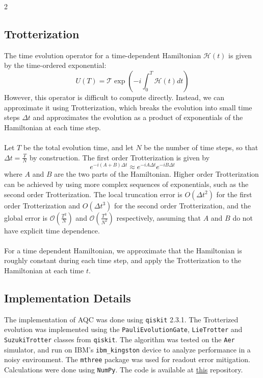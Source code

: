 \documentclass[10pt]{article}
\begin{document}
\begin{multicols*}{2}
\subsection{Trotterization}
\label{sec:trotterization}
The time evolution operator for a time-dependent Hamiltonian $\mathcal{H}(t)$ is given by the time-ordered exponential:
$$U(T) = \mathcal{T} \exp\left(-i \int_0^T \mathcal{H}(t) dt\right)$$
However, this operator is difficult to compute directly. Instead, we can approximate it using Trotterization,
which breaks the evolution into small time steps $\Delta t$ and approximates the evolution as a product of exponentials of the Hamiltonian at each time step. \\\\
Let $T$ be the total evolution time, and let $N$ be the number of time steps, so that $\Delta t = \frac{T}{N}$ by construction. The first order Trotterization is given by 
$$e^{-i (A + B) \Delta t} \approx e^{-i A \Delta t} e^{-i B \Delta t}$$
where $A$ and $B$ are the two parts of the Hamiltonian. Higher order Trotterization can be achieved by using more complex sequences of exponentials, such as the second order Trotterization.
The local truncation error is $O(\Delta t^2)$ for the first order Trotterization and $O(\Delta t^3)$ for the second order Trotterization, and the global error is $\mathcal O(\frac{T^2}{N})$ and $\mathcal O(\frac{T^3}{N^2})$ respectively, assuming that $A$ and $B$ do not have explicit time dependence.\\\\
For a time dependent Hamiltonian, we approximate that the Hamiltonian is roughly constant during each time step, and apply the Trotterization to the Hamiltonian at each time $t$.
\subsection{Implementation Details} 
The implementation of AQC was done using \texttt{qiskit}\cite{javadi-abhariQuantumComputingQiskit2024} 2.3.1. The Trotterized evolution was implemented using the \texttt{PauliEvolutionGate}, \texttt{LieTrotter} and 
\texttt{SuzukiTrotter} classes from \texttt{qiskit}. The algorithm was tested on the \texttt{Aer} simulator, and run on IBM's \texttt{ibm\_kingston} device to analyze performance in a noisy environment. The \texttt{mthree} package was used for readout error mitigation. Calculations were done using \texttt{NumPy}\cite{harrisArrayProgrammingNumPy2020}. The code is available at \href{https://github.com/hkbelagali/Adiabatic-Quantum-Computation}{this} repository.

\end{multicols*}
\end{document}

